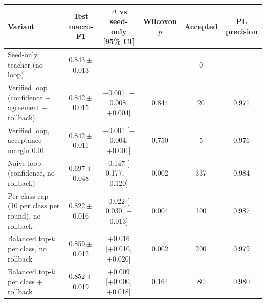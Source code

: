 \begin{tabular}{lccccc}
\toprule
Variant & Test macro-F1 & $\Delta$ vs seed-only [95\% CI] & Wilcoxon $p$ & Accepted & PL precision \\
\midrule
Seed-only teacher (no loop) & 0.843\,$\pm$\,0.013 & -- & -- & 0 & -- \\
\addlinespace
Verified loop (confidence + agreement + rollback) & 0.842\,$\pm$\,0.015 & $-$0.001 [$-$0.008, +0.004] & 0.844 & 20 & 0.971 \\
Verified loop, acceptance margin 0.01 & 0.842\,$\pm$\,0.011 & $-$0.001 [$-$0.004, +0.001] & 0.750 & 5 & 0.976 \\
Naive loop (confidence, no rollback) & 0.697\,$\pm$\,0.048 & $-$0.147 [$-$0.177, $-$0.120] & 0.002 & 337 & 0.984 \\
Per-class cap (10 per class per round), no rollback & 0.822\,$\pm$\,0.016 & $-$0.022 [$-$0.030, $-$0.013] & 0.004 & 100 & 0.987 \\
Balanced top-$k$ per class, no rollback & 0.859\,$\pm$\,0.012 & +0.016 [+0.010, +0.020] & 0.002 & 200 & 0.979 \\
Balanced top-$k$ per class + rollback & 0.852\,$\pm$\,0.019 & +0.009 [+0.000, +0.018] & 0.164 & 80 & 0.980 \\
\bottomrule
\end{tabular}
